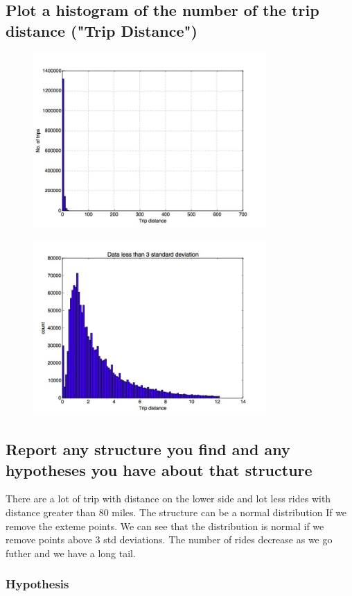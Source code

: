 \documentclass[letterpaper, 11pt]{article}
\begin{document}
\subsection*{Plot a histogram of the number of the trip distance ("Trip Distance")}
\begin{figure}[h]
	\includegraphics[width=3.5in]{Question2a.jpg}
\end{figure}
\begin{figure}[h]
	\includegraphics[width=3.5in]{Question2b.jpg}
\end{figure}
\subsection*{Report any structure you find and any hypotheses you have about that structure}
There are a lot of trip with distance on the lower side and lot less rides with distance greater than 80 miles.
The structure can be a normal distribution If we remove the exteme points. We can see that the distribution is normal if we remove points above 3 std deviations.
The number of rides decrease as we go futher and we have a long tail.\\

\subsubsection*{Hypothesis}
\end{document}
